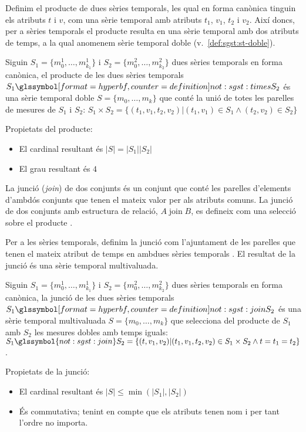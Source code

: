 Definim el producte de dues sèries temporals, les qual en
forma canònica tinguin els atributs $t$ i $v$, com una sèrie temporal
amb atributs $t_1$, $v_1$, $t_2$ i $v_2$. Així doncs, per a sèries
temporals el producte resulta en una sèrie temporal amb dos atributs
de temps, a la qual anomenem sèrie temporal doble (v.\
\autoref{def:sgst:st-doble}).
\begin{definition}[producte]
  Siguin $S_1=\{m_0^1, \dotsc, m_{k_1}^1\}$ i $S_2=\{m_0^2, \dotsc,
  m_{k_2}^2\}$ dues sèries temporals en forma canònica, el producte de
  les dues sèries temporals $S_1 \glssymboldef{not:sgst:times}
  S_2$ és una sèrie temporal doble $S=\{m_0, \dotsc, m_k\}$ que conté
  la unió de totes les parelles de mesures de $S_1$ i $S_2$: $S_1
  \times S_2 = \{ (t_1,v_1,t_2,v_2) | (t_1,v_1) \in S_1 \wedge
  (t_2,v_2) \in S_2 \}$
\end{definition}

Propietats del producte:
\begin{itemize}
\item El cardinal resultant és $|S|=|S_1||S_2|$
\item El grau resultant és $4$
\end{itemize}



La junció (\emph{join}) de dos conjunts és un conjunt que conté les
parelles d'elements d'ambdós conjunts que tenen el mateix valor per
als atributs comuns.  La junció de dos conjunts amb estructura de
relació, $A \operatorname{join} B$, es defineix com una selecció sobre el
producte \parencite[cap.~7]{date04:introduction8}.


Per a les sèries temporals, definim la junció com l'ajuntament de les
parelles que tenen el mateix atribut de temps en ambdues sèries
temporals . El resultat de la junció és una sèrie temporal
multivaluada.
\begin{definition}[junció]\label{def:sgst:join}
  Siguin $S_1=\{m_0^1, \dotsc, m_{k_1}^1\}$ i $S_2=\{m_0^2, \dotsc,
  m_{k_2}^2\}$ dues sèries temporals en forma canònica, la junció de
  les dues sèries temporals $S_1 \glssymboldef{not:sgst:join} S_2$ és
  una sèrie temporal multivaluada $S=\{m_0, \dotsc, m_k\}$ que
  selecciona del producte de $S_1$ amb $S_2$ les mesures dobles amb
  temps iguals: $S_1 \glssymbol{not:sgst:join} S_2 = \{ (t,v_1,v_2) |
  (t_1,v_1,t_2,v_2) \in S_1\times S_2 \wedge t=t_1=t_2 \}$.
\end{definition}


Propietats de la junció:
\begin{itemize}
\item El cardinal resultant és $|S|\leq\min(|S_1|,|S_2|)$
\item És commutativa; tenint en compte que els atributs tenen nom i
  per tant l'ordre no importa.
\end{itemize}




